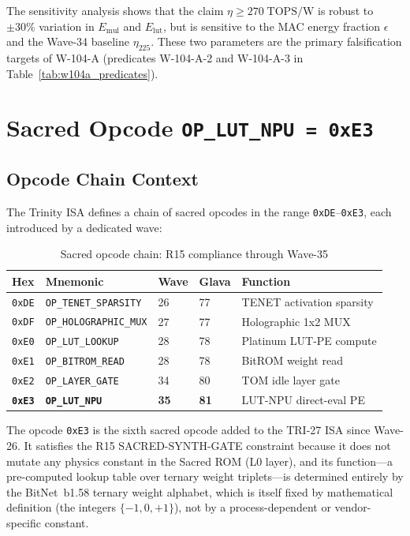 \noindent The sensitivity analysis shows that the claim $\eta \geq 270\;\mathrm{TOPS/W}$
is robust to $\pm 30\%$ variation in $E_{\mathrm{mul}}$ and $E_{\mathrm{lut}}$,
but is sensitive to the MAC energy fraction $\epsilon$ and the Wave-34 baseline
$\eta_{225}$.  These two parameters are the primary falsification targets of
W-104-A (predicates W-104-A-2 and W-104-A-3 in Table~\ref{tab:w104a_predicates}).

\section{Sacred Opcode \texttt{OP\_LUT\_NPU = 0xE3}}
\label{sec:opcode}

\subsection{Opcode Chain Context}

The Trinity ISA defines a chain of sacred opcodes in the range
\texttt{0xDE}--\texttt{0xE3}, each introduced by a dedicated wave:

\begin{table}[ht]
\centering
\caption{Sacred opcode chain: R15 compliance through Wave-35}
\label{tab:opcode_chain}
\begin{tabular}{lllll}
\hline
Hex & Mnemonic & Wave & Glava & Function \\
\hline
\texttt{0xDE} & \texttt{OP\_TENET\_SPARSITY}   & 26 & 77 & TENET activation sparsity \\
\texttt{0xDF} & \texttt{OP\_HOLOGRAPHIC\_MUX}  & 27 & 77 & Holographic 1x2 MUX \\
\texttt{0xE0} & \texttt{OP\_LUT\_LOOKUP}        & 28 & 78 & Platinum LUT-PE compute \\
\texttt{0xE1} & \texttt{OP\_BITROM\_READ}        & 28 & 78 & BitROM weight read \\
\texttt{0xE2} & \texttt{OP\_LAYER\_GATE}         & 34 & 80 & TOM idle layer gate \\
\texttt{\textbf{0xE3}} & \textbf{\texttt{OP\_LUT\_NPU}} & \textbf{35} & \textbf{81} & LUT-NPU direct-eval PE \\
\hline
\end{tabular}
\end{table}

The opcode \texttt{0xE3} is the sixth sacred opcode added to the TRI-27 ISA
since Wave-26.  It satisfies the R15 SACRED-SYNTH-GATE constraint because it
does not mutate any physics constant in the Sacred ROM (L0 layer), and its
function---a pre-computed lookup table over ternary weight triplets---is
determined entirely by the BitNet~b1.58 ternary weight alphabet, which is
itself fixed by mathematical definition (the integers $\{-1, 0, +1\}$), not
by a process-dependent or vendor-specific constant.

